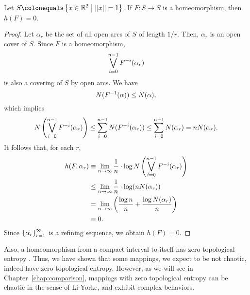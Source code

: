 \documentclass[10pt,twoside,draft]{book}
\begin{document}
\begin{proposition}
  \citep{akm}
  Let $S \ceq \setst{x \in \R^2}{\norm{x} = 1}$.
  If $F: S \to S$ is a homeomorphism, then $h(F) = 0$.
  \begin{proof}
    Let $\alpha_r$ be the set of all open arcs of $S$ of length $1/r$.
    Then, $\alpha_r$ is an open cover of $S$.
    Since $F$ is a homeomorphism, 
    \begin{equation*}
      \bigvee\limits_{i = 0}^{n-1} F^{-i}(\alpha_r)
    \end{equation*}
    is also a covering of $S$ by open arcs.
    We have
    \begin{equation*}
      N(F^{-1}(\alpha)) \leq N(\alpha),
    \end{equation*}
    which implies
    \begin{equation*}
      N\left (  \bigvee\limits_{i = 0}^{n-1} F^{-i}(\alpha_r)  \right )
      \leq \sum\limits_{i = 0}^{n-1} N(F^{-i}(\alpha_r))
      \leq \sum\limits_{i = 0}^{n-1} N(\alpha_r)
      = n N(\alpha_r).
    \end{equation*}
    It follows that, for each $r$,
    \begin{align*}
      h(F, \alpha_r) 
      &\equiv \lim\limits_{n \to \infty} \frac{1}{n} \cdot \log N\left (  \bigvee\limits_{i = 0}^{n-1} F^{-i}(\alpha_r)  \right )  \\
      &\leq \lim\limits_{n \to \infty} \frac{1}{n} \cdot \log (n N(\alpha_r))  \\
      &= \lim\limits_{n \to \infty}\left (  \frac{\log n}{n} + \frac{\log N(\alpha_r)}{n}  \right ) \\
      &= 0.
    \end{align*}
    Since $\left \{ \alpha_r \right \}^{\infty}_{r = 1}$ is a refining sequence, we obtain $h(F) = 0$.
  \end{proof}
\end{proposition}
Also, a homeomorphism from a compact interval to itself has zero topological entropy \citep[p.180]{walters}.
Thus, we have shown that some mappings, we expect to be not chaotic, indeed have zero topological entropy. 
However, as we will see in Chapter~\ref{chap:comparison}, mappings with zero topological entropy can be chaotic in the sense of Li-Yorke, and exhibit complex behaviors.




\printindex
\end{document}
